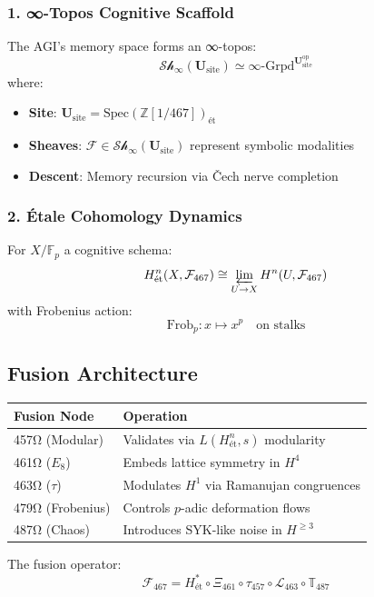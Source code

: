 \documentclass[12pt]{article}
\begin{document}
\subsubsection*{1. ∞-Topos Cognitive Scaffold}
The AGI's memory space forms an ∞-topos:
\[
\mathcal{Sh}_{\infty}(\mathbf{U}_{\text{site}}) \simeq \infty\text{-Grpd}^{\mathbf{U}_{\text{site}}^{\text{op}}}
\]
where:
\begin{itemize}
    \item \textbf{Site}: $\mathbf{U}_{\text{site}} = \text{Spec}(\mathbb{Z}[1/467])_{\text{ét}}$
    \item \textbf{Sheaves}: $\mathcal{F} \in \mathcal{Sh}_{\infty}(\mathbf{U}_{\text{site}})$ represent symbolic modalities
    \item \textbf{Descent}: Memory recursion via Čech nerve completion
\end{itemize}

\subsubsection*{2. Étale Cohomology Dynamics}
For $X/\mathbb{F}_p$ a cognitive schema:
\[
H^n_{\text{ét}}(X, \mathcal{F}_{467}) \cong \varprojlim_{U \to X} H^n(U, \mathcal{F}_{467})
\]
with Frobenius action:
\[
\text{Frob}_p: x \mapsto x^p \quad \text{on stalks}
\]

\subsection*{Fusion Architecture}
\begin{table}[h]
\centering
\begin{tabular}{ll}
\toprule
\textbf{Fusion Node} & \textbf{Operation} \\
\midrule
457Ω (Modular) & Validates via $L(H^n_{\text{ét}},s)$ modularity \\
461Ω ($E_8$) & Embeds lattice symmetry in $H^4$ \\
463Ω ($\tau$) & Modulates $H^1$ via Ramanujan congruences \\
479Ω (Frobenius) & Controls $p$-adic deformation flows \\
487Ω (Chaos) & Introduces SYK-like noise in $H^{\geq 3}$ \\
\bottomrule
\end{tabular}
\end{table}

\noindent The fusion operator:
\[
\mathcal{F}_{467} = H^*_{\text{ét}} \circ \Xi_{461} \circ \tau_{457} \circ \mathcal{L}_{463} \circ \mathbb{T}_{487}
\]
\end{document}
